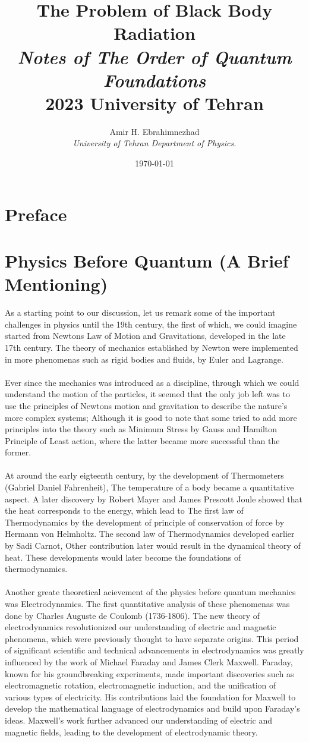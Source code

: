 \documentclass[9pt,a4paper, twocolumn]{article}
\title{The Problem of Black Body Radiation \\ \large \textit{Notes of The Order of Quantum Foundations} \\ 2023 University of Tehran}
\date{\today}
\author{Amir H. Ebrahimnezhad \\ \small \textit{University of Tehran Department of Physics.}}
\newcounter{theo}
\begin{document}
    \maketitle
    \tableofcontents
    \section*{Preface}
    \section{Physics Before Quantum (A Brief Mentioning)}
        As a starting point to our discussion, let us remark some of the important challenges in physics until the 19th century, the first of which, we could imagine started from Newtons Law of Motion and Gravitations, developed in the late 17th century. The theory of mechanics established by Newton were implemented in more phenomenas such as rigid bodies and fluids, by Euler and Lagrange.
        \\
        \\
        Ever since the mechanics was introduced as a discipline, through which we could understand the motion of the particles, it seemed that the only job left was to use the principles of Newtons motion and gravitation to describe the nature's more complex systems; Although it is good to note that some tried to add more principles into the theory such as Minimum Stress by Gauss and Hamilton Principle of Least action, where the latter became more successful than the former.
        \\
        \\
        At around the early eigteenth century, by the development of Thermometers (Gabriel Daniel Fahrenheit), The temperature of a body became a quantitative aspect. A later discovery by Robert Mayer and James Prescott Joule showed that the heat corresponds to the energy, which lead to The first law of Thermodynamics by the development of principle of conservation of force by Hermann von Helmholtz. The second law of Thermodynamics developed earlier by Sadi Carnot, Other contribution later would result in the dynamical theory of heat. These developments would later become the foundations of thermodynamics.
        \\
        \\
        Another greate theoretical acievement of the physics before quantum mechanics was Electrodynamics. The first quantitative analysis of these phenomenas was done by Charles Auguste de Coulomb (1736-1806). The new theory of electrodynamics revolutionized our understanding of electric and magnetic phenomena, which were previously thought to have separate origins. This period of significant scientific and technical advancements in electrodynamics was greatly influenced by the work of Michael Faraday and James Clerk Maxwell. Faraday, known for his groundbreaking experiments, made important discoveries such as electromagnetic rotation, electromagnetic induction, and the unification of various types of electricity. His contributions laid the foundation for Maxwell to develop the mathematical language of electrodynamics and build upon Faraday's ideas. Maxwell's work further advanced our understanding of electric and magnetic fields, leading to the development of electrodynamic theory.
\end{document}
